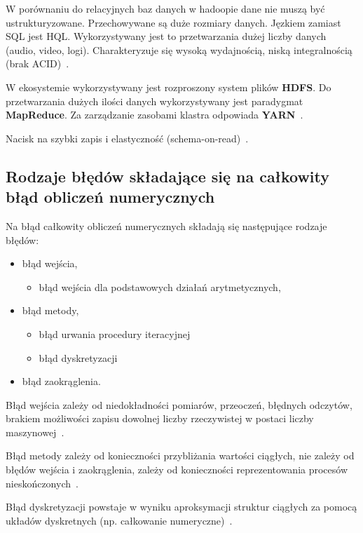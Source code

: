 \documentclass[wi]{zut}
\begin{document}
W porównaniu do relacyjnych baz danych w hadoopie dane nie muszą być ustrukturyzowane. Przechowywane są duże rozmiary danych. Jęzkiem zamiast SQL jest HQL. Wykorzystywany jest to przetwarzania dużej liczby danych (audio, video, logi). Charakteryzuje się wysoką wydajnością, niską integralnością (brak ACID)~\cite{Korytkowski_hadoop}.

W ekosystemie wykorzystywany jest rozproszony system plików \textbf{HDFS}. Do przetwarzania dużych ilości danych wykorzystywany jest paradygmat \textbf{MapReduce}. Za zarządzanie zasobami klastra odpowiada \textbf{YARN}~\cite{Korytkowski_hadoop}.

Nacisk na szybki zapis i elastyczność (schema-on-read)~\cite{Korytkowski_hadoop}.

\subsection{Rodzaje błędów składające się na całkowity błąd obliczeń numerycznych}
Na błąd całkowity obliczeń numerycznych składają się następujące rodzaje błędów:
\begin{itemize}
    \item błąd wejścia,
    \begin{itemize}
        \item błąd wejścia dla podstawowych działań arytmetycznych, 
    \end{itemize}
    \item błąd metody,
    \begin{itemize}
        \item błąd urwania procedury iteracyjnej
        \item błąd dyskretyzacji
    \end{itemize}
    \item błąd zaokrąglenia.
\end{itemize}

Błąd wejścia zależy od niedokładności pomiarów, przeoczeń, błędnych odczytów, brakiem możliwości zapisu dowolnej liczby rzeczywistej w postaci liczby maszynowej~\cite{Piela_Wstep}.

Błąd metody zależy od konieczności przybliżania wartości ciągłych, nie zależy od błędów wejścia i zaokrąglenia, zależy od konieczności reprezentowania procesów nieskończonych~\cite{Piela_Wstep}.

Błąd dyskretyzacji powstaje w wyniku aproksymacji struktur ciągłych za pomocą układów dyskretnych (np. całkowanie numeryczne)~\cite{Piela_Wstep}.
\end{document}
